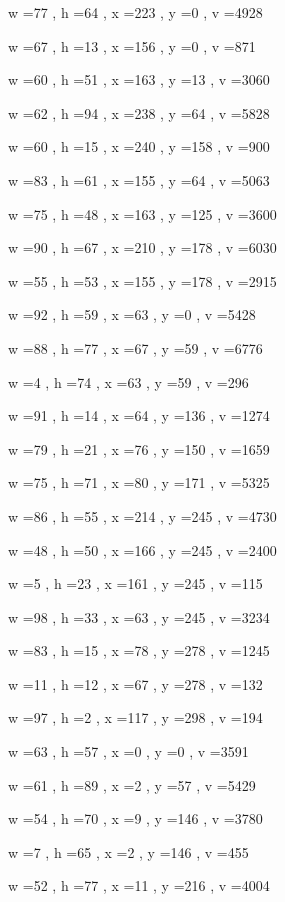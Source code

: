 \documentclass[11pt]{article}
\begin{document}
w =77 , h =64 , x =223 , y =0 , v =4928
\par
w =67 , h =13 , x =156 , y =0 , v =871
\par
w =60 , h =51 , x =163 , y =13 , v =3060
\par
w =62 , h =94 , x =238 , y =64 , v =5828
\par
w =60 , h =15 , x =240 , y =158 , v =900
\par
w =83 , h =61 , x =155 , y =64 , v =5063
\par
w =75 , h =48 , x =163 , y =125 , v =3600
\par
w =90 , h =67 , x =210 , y =178 , v =6030
\par
w =55 , h =53 , x =155 , y =178 , v =2915
\par
w =92 , h =59 , x =63 , y =0 , v =5428
\par
w =88 , h =77 , x =67 , y =59 , v =6776
\par
w =4 , h =74 , x =63 , y =59 , v =296
\par
w =91 , h =14 , x =64 , y =136 , v =1274
\par
w =79 , h =21 , x =76 , y =150 , v =1659
\par
w =75 , h =71 , x =80 , y =171 , v =5325
\par
w =86 , h =55 , x =214 , y =245 , v =4730
\par
w =48 , h =50 , x =166 , y =245 , v =2400
\par
w =5 , h =23 , x =161 , y =245 , v =115
\par
w =98 , h =33 , x =63 , y =245 , v =3234
\par
w =83 , h =15 , x =78 , y =278 , v =1245
\par
w =11 , h =12 , x =67 , y =278 , v =132
\par
w =97 , h =2 , x =117 , y =298 , v =194
\par
w =63 , h =57 , x =0 , y =0 , v =3591
\par
w =61 , h =89 , x =2 , y =57 , v =5429
\par
w =54 , h =70 , x =9 , y =146 , v =3780
\par
w =7 , h =65 , x =2 , y =146 , v =455
\par
w =52 , h =77 , x =11 , y =216 , v =4004
\par
\newpage
\end{document}
